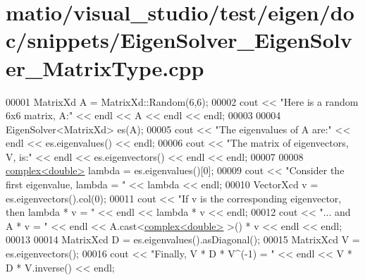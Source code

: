 \hypertarget{matio_2visual__studio_2test_2eigen_2doc_2snippets_2_eigen_solver___eigen_solver___matrix_type_8cpp_source}{}\section{matio/visual\+\_\+studio/test/eigen/doc/snippets/\+Eigen\+Solver\+\_\+\+Eigen\+Solver\+\_\+\+Matrix\+Type.cpp}
\label{matio_2visual__studio_2test_2eigen_2doc_2snippets_2_eigen_solver___eigen_solver___matrix_type_8cpp_source}

\begin{DoxyCode}
00001 MatrixXd A = MatrixXd::Random(6,6);
00002 cout << \textcolor{stringliteral}{"Here is a random 6x6 matrix, A:"} << endl << A << endl << endl;
00003 
00004 EigenSolver<MatrixXd> es(A);
00005 cout << \textcolor{stringliteral}{"The eigenvalues of A are:"} << endl << es.eigenvalues() << endl;
00006 cout << \textcolor{stringliteral}{"The matrix of eigenvectors, V, is:"} << endl << es.eigenvectors() << endl << endl;
00007 
00008 \hyperlink{structcomplex}{complex<double>} lambda = es.eigenvalues()[0];
00009 cout << \textcolor{stringliteral}{"Consider the first eigenvalue, lambda = "} << lambda << endl;
00010 VectorXcd v = es.eigenvectors().col(0);
00011 cout << \textcolor{stringliteral}{"If v is the corresponding eigenvector, then lambda * v = "} << endl << lambda * v << endl;
00012 cout << \textcolor{stringliteral}{"... and A * v = "} << endl << A.cast<\hyperlink{structcomplex}{complex<double>} >() * v << endl << endl;
00013 
00014 MatrixXcd D = es.eigenvalues().asDiagonal();
00015 MatrixXcd V = es.eigenvectors();
00016 cout << \textcolor{stringliteral}{"Finally, V * D * V^(-1) = "} << endl << V * D * V.inverse() << endl;
\end{DoxyCode}
